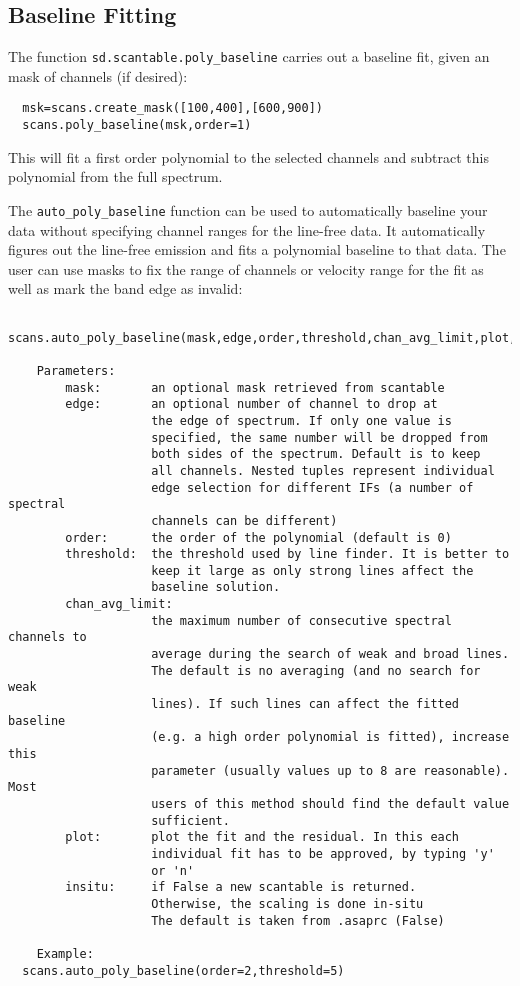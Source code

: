 \subsection{Baseline Fitting}
\label{subsection:sd.asap.BLfitting}

The function {\tt sd.scantable.poly\_baseline} carries out a
baseline fit, given an mask of channels (if desired):
\small
\begin{verbatim}
  msk=scans.create_mask([100,400],[600,900])
  scans.poly_baseline(msk,order=1)
\end{verbatim}
\normalsize
This will fit a first order polynomial to the selected channels and
subtract this polynomial from the full spectrum.

The {\tt auto\_poly\_baseline} function can be used to automatically
baseline your data without specifying channel ranges for the
line-free data. It automatically figures out the line-free emission
and fits a polynomial baseline to that data. The user can use masks to
fix the range of channels or velocity range for the fit as well as
mark the band edge as invalid:


\small
\begin{verbatim}
  scans.auto_poly_baseline(mask,edge,order,threshold,chan_avg_limit,plot,insitu):

    Parameters:
        mask:       an optional mask retrieved from scantable
        edge:       an optional number of channel to drop at
                    the edge of spectrum. If only one value is
                    specified, the same number will be dropped from
                    both sides of the spectrum. Default is to keep
                    all channels. Nested tuples represent individual
                    edge selection for different IFs (a number of spectral
                    channels can be different)
        order:      the order of the polynomial (default is 0)
        threshold:  the threshold used by line finder. It is better to
                    keep it large as only strong lines affect the
                    baseline solution.
        chan_avg_limit:
                    the maximum number of consecutive spectral channels to
                    average during the search of weak and broad lines.
                    The default is no averaging (and no search for weak
                    lines). If such lines can affect the fitted baseline
                    (e.g. a high order polynomial is fitted), increase this
                    parameter (usually values up to 8 are reasonable). Most
                    users of this method should find the default value
                    sufficient.
        plot:       plot the fit and the residual. In this each
                    individual fit has to be approved, by typing 'y'
                    or 'n'
        insitu:     if False a new scantable is returned.
                    Otherwise, the scaling is done in-situ
                    The default is taken from .asaprc (False)

    Example:
  scans.auto_poly_baseline(order=2,threshold=5)
\end{verbatim}
\normalsize


